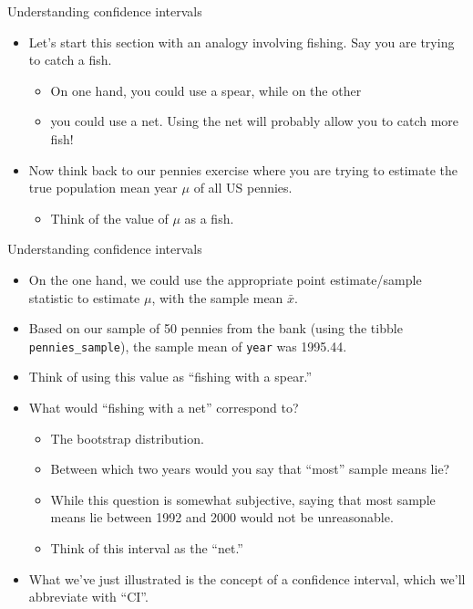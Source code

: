 \documentclass[
  ignorenonframetext,
]{beamer}
\providecommand{\tightlist}{%
  \setlength{\itemsep}{0pt}\setlength{\parskip}{0pt}}
\begin{document}
\begin{frame}{Understanding confidence intervals}
\protect\hypertarget{understanding-confidence-intervals-1}{}
\begin{itemize}
\item
  Let's start this section with an analogy involving fishing. Say you
  are trying to catch a fish.

  \begin{itemize}
  \tightlist
  \item
    On one hand, you could use a spear, while on the other
  \item
    you could use a net. Using the net will probably allow you to catch
    more fish!
  \end{itemize}
\item
  Now think back to our pennies exercise where you are trying to
  estimate the true population mean year \(\mu\) of all US pennies.

  \begin{itemize}
  \tightlist
  \item
    Think of the value of \(\mu\) as a fish.
  \end{itemize}
\end{itemize}
\end{frame}

\begin{frame}[fragile]{Understanding confidence intervals}
\protect\hypertarget{understanding-confidence-intervals-2}{}
\begin{itemize}
\item
  On the one hand, we could use the appropriate point estimate/sample
  statistic to estimate \(\mu\), with the sample mean \(\bar{x}\).
\item
  Based on our sample of 50 pennies from the bank (using the tibble
  \texttt{pennies\_sample}), the sample mean of \texttt{year} was
  1995.44.
\item
  Think of using this value as ``fishing with a spear.''
\item
  What would ``fishing with a net'' correspond to?

  \begin{itemize}
  \tightlist
  \item
    The bootstrap distribution.
  \item
    Between which two years would you say that ``most'' sample means
    lie?
  \item
    While this question is somewhat subjective, saying that most sample
    means lie between 1992 and 2000 would not be unreasonable.
  \item
    Think of this interval as the ``net.''
  \end{itemize}
\item
  What we've just illustrated is the concept of a confidence interval,
  which we'll abbreviate with ``CI''.
\end{itemize}
\end{frame}
\end{document}
